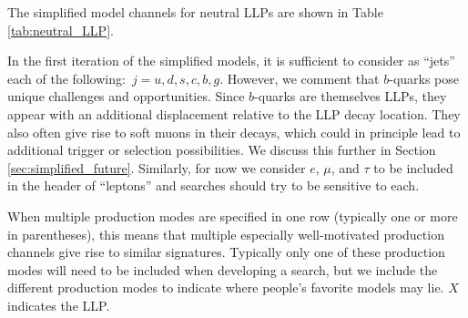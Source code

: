 The simplified model channels for neutral LLPs are shown in Table
\ref{tab:neutral_LLP}.  

 
 In the first iteration of the simplified
models, it is sufficient to consider as ``jets'' each of the
following:~$j=u,d,s,c,b,g$. However, we comment that $b$-quarks pose
unique challenges and opportunities. Since $b$-quarks are themselves
LLPs, they appear with an additional displacement relative to the LLP
decay location. They also often give rise to soft muons in their
decays, which could in principle lead to additional trigger or
selection possibilities. We discuss this further in Section
\ref{sec:simplified_future}. Similarly, for now we consider $e$,
$\mu$, and $\tau$ to be included in the header of ``leptons'' and
searches should try to be sensitive to each.
 
When multiple production modes are specified in one row (typically one
or more in parentheses), this means that multiple especially
well-motivated production channels give rise to similar
signatures. Typically only one of these production modes will need to
be included when developing a search, but we include the different production modes
to indicate where people's favorite models may lie. $X$ indicates the
LLP.


